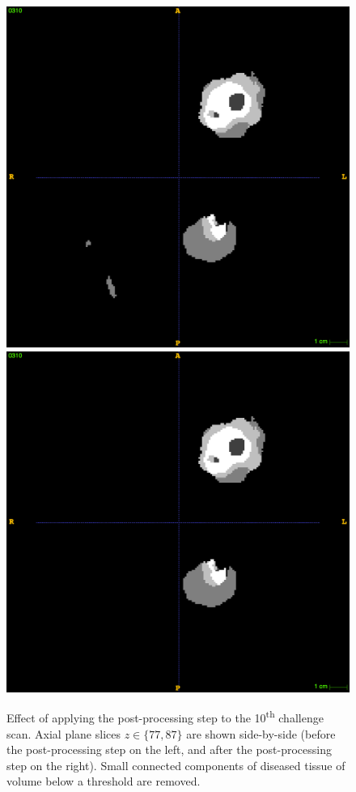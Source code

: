 \documentclass[12pt,a4paper,twoside,openright]{report}
\begin{document}
\begin{figure}[h]
	\vspace{0.5cm}
	\includegraphics[scale = 0.1]{challenge10_no_post_87}
	\includegraphics[scale = 0.1]{challenge10_with_post_87}
	\caption[Effect of applying the post-processing step.]{Effect of applying the post-processing step to the 10\textsuperscript{th} challenge scan. Axial plane slices $z \in \{77,87\}$ are shown side-by-side (before the post-processing step on the left, and after the post-processing step on the right). Small connected components of diseased tissue of volume below a threshold are removed.} 
	\label{fig:connected_components_example}
\end{figure}
\end{document}
